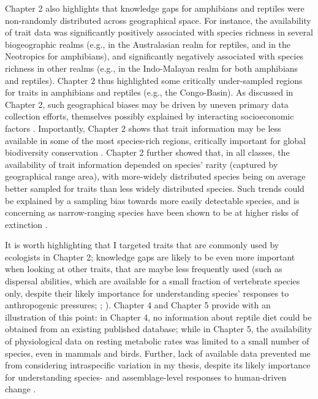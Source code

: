 Chapter 2 also highlights that knowledge gaps for amphibians and reptiles were non-randomly distributed across geographical space. For instance, the availability of trait data was significantly positively associated with species richness in several biogeographic realms (e.g., in the Australasian realm for reptiles, and in the Neotropics for amphibians), and significantly negatively associated with species richness in other realms (e.g., in the Indo-Malayan realm for both amphibians and reptiles). Chapter 2 thus highlighted some critically under-sampled regions for traits in amphibians and reptiles (e.g., the Congo-Basin). As discussed in Chapter 2, such geographical biases may be driven by uneven primary data collection efforts, themselves possibly explained by interacting socioeconomic factors \citep{Collen2008, Martin2012, Hortal2015, ONU2015}. Importantly, Chapter 2 shows that trait information may be less available in some of the most species-rich regions, critically important for global biodiversity conservation \citep{Barlow2018}. Chapter 2 further showed that, in all classes, the availability of trait information depended on species' rarity (captured by geographical range area), with more-widely distributed species being on average better sampled for traits than less widely distributed species. Such trends could be explained by a sampling bias towards more easily detectable species, and is concerning as narrow-ranging species have been shown to be at higher risks of extinction \citep{Chichorro2019}. 

It is worth highlighting that I targeted traits that are commonly used by ecologists in Chapter 2; knowledge gaps are likely to be even more important when looking at other traits, that are maybe less frequently used (such as dispersal abilities, which are available for a small fraction of vertebrate species only, despite their likely importance for understanding species' responses to anthropogenic pressures; \citet{Schloss2012}; \citet{Lenoir2015}). Chapter 4 and Chapter 5 provide with an illustration of this point: in Chapter 4, no information about reptile diet could be obtained from an existing published database; while in Chapter 5, the availability of physiological data on resting metabolic rates was limited to a small number of species, even in mammals and birds. Further, lack of available data prevented me from considering intraspecific variation in my thesis, despite its likely importance for understanding species- and assemblage-level responses to human-driven change \citep{Carlson2014, Guralnick2016, Rohr2018}. 

